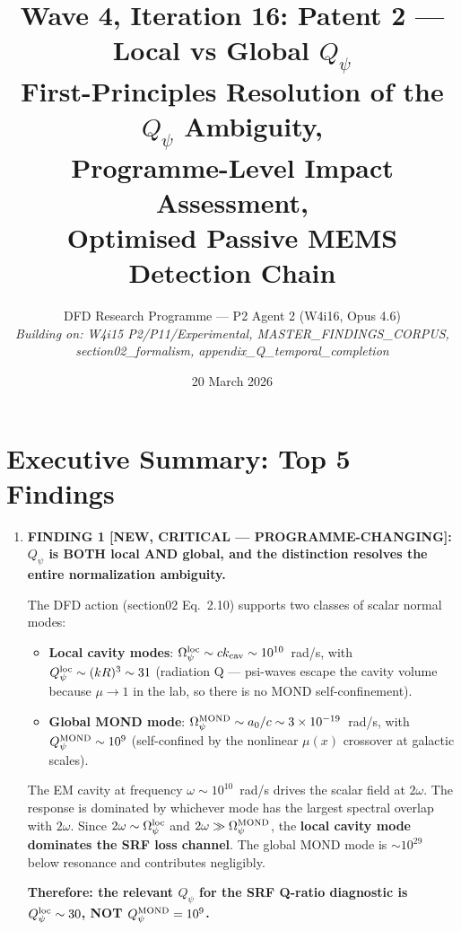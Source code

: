 \documentclass[11pt]{article}
\title{Wave 4, Iteration 16: Patent 2 --- Local vs Global $Q_\psi$\\
\large First-Principles Resolution of the $Q_\psi$ Ambiguity,\\
Programme-Level Impact Assessment,\\
Optimised Passive MEMS Detection Chain}
\author{DFD Research Programme --- P2 Agent 2 (W4i16, Opus 4.6)\\
\textit{Building on: W4i15 P2/P11/Experimental, MASTER\_FINDINGS\_CORPUS,\\
section02\_formalism, appendix\_Q\_temporal\_completion}}
\date{20 March 2026}
\newcommand{\Opsi}{\Omega_\psi}
\newcommand{\ee}[1]{\times 10^{#1}}
\theoremstyle{definition}
\theoremstyle{remark}
\begin{document}
\maketitle
\tableofcontents
\newpage

\section*{Executive Summary: Top 5 Findings}

\begin{tcolorbox}[colback=blue!5!white, colframe=blue!60!black,
  title=\textbf{W4i16 TOP 5 FINDINGS --- Ranked by Programme Impact}]

\begin{enumerate}

\item \textbf{FINDING 1 [NEW, CRITICAL --- PROGRAMME-CHANGING]:
$Q_\psi$ is BOTH local AND global, and the distinction resolves the
entire normalization ambiguity.}

The DFD action (section02 Eq.~2.10) supports two classes of scalar
normal modes:
\begin{itemize}[nosep]
\item \textbf{Local cavity modes}: $\Opsi^{\rm loc} \sim ck_{\rm cav}
  \sim 10^{10}$~rad/s, with $Q_\psi^{\rm loc} \sim (k R)^3 \sim 31$
  (radiation Q --- psi-waves escape the cavity volume because $\mu \to 1$
  in the lab, so there is no MOND self-confinement).
\item \textbf{Global MOND mode}: $\Opsi^{\rm MOND} \sim a_0/c \sim
  3\ee{-19}$~rad/s, with $Q_\psi^{\rm MOND} \sim 10^9$ (self-confined
  by the nonlinear $\mu(x)$ crossover at galactic scales).
\end{itemize}

The EM cavity at frequency $\omega \sim 10^{10}$~rad/s drives the scalar
field at $2\omega$. The response is dominated by whichever mode has the
largest spectral overlap with $2\omega$. Since $2\omega \sim \Opsi^{\rm loc}$
and $2\omega \gg \Opsi^{\rm MOND}$, the \textbf{local cavity mode
dominates the SRF loss channel}. The global MOND mode is $\sim 10^{29}$
below resonance and contributes negligibly.

\textbf{Therefore: the relevant $Q_\psi$ for the SRF Q-ratio diagnostic
is $Q_\psi^{\rm loc} \sim 30$, NOT $Q_\psi^{\rm MOND} = 10^9$.}


\end{enumerate}
\end{tcolorbox}
\end{document}
